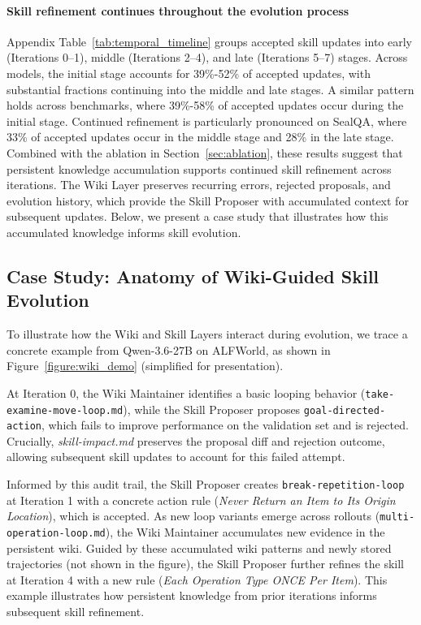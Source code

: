 \documentclass[11pt, a4paper, copyright, gr]{google}
\begin{document}


\paragraph{Skill refinement continues throughout the evolution process} Appendix Table~\ref{tab:temporal_timeline} groups accepted skill updates into early (Iterations 0–1), middle (Iterations 2–4), and late (Iterations 5–7) stages. Across models, the initial stage accounts for 39\%-52\% of accepted updates, with substantial fractions continuing into the middle and late stages. A similar pattern holds across benchmarks, where 39\%-58\% of accepted updates occur during the initial stage. Continued refinement is particularly pronounced on SealQA, where 33\% of accepted updates occur in the middle stage and 28\% in the late stage. Combined with the ablation in Section~\ref{sec:ablation}, these results suggest that persistent knowledge accumulation supports continued skill refinement across iterations. The Wiki Layer preserves recurring errors, rejected proposals, and evolution history, which provide the Skill Proposer with accumulated context for subsequent updates. Below, we present a case study that illustrates how this accumulated knowledge informs skill evolution.


\subsection{Case Study: Anatomy of Wiki-Guided Skill Evolution}
\label{subsec:case_study}
To illustrate how the Wiki and Skill Layers interact during evolution, we trace a concrete example from Qwen-3.6-27B on ALFWorld, as shown in Figure~\ref{figure:wiki_demo} (simplified for presentation).

At Iteration 0, the Wiki Maintainer identifies a basic looping behavior (\texttt{\nolinkurl{take-examine-move-loop.md}}), while the Skill Proposer proposes \texttt{goal-directed-action}, which fails to improve performance on the validation set and is rejected. Crucially, \textit{skill-impact.md} preserves the proposal diff and rejection outcome, allowing subsequent skill updates to account for this failed attempt.


Informed by this audit trail, the Skill Proposer creates \texttt{break-repetition-loop} at Iteration 1 with a concrete action rule (\emph{Never Return an Item to Its Origin Location}), which is accepted. As new loop variants emerge across rollouts (\texttt{multi-operation-loop.md}), the Wiki Maintainer accumulates new evidence in the persistent wiki. Guided by these accumulated wiki patterns and newly stored trajectories (not shown in the figure), the Skill Proposer further refines the skill at Iteration 4 with a new rule (\emph{Each Operation Type ONCE Per Item}). This example illustrates how persistent knowledge from prior iterations informs subsequent skill refinement.
\end{document}
